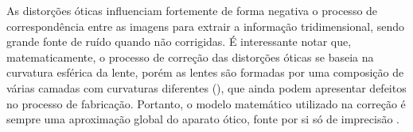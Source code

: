 As distorções óticas influenciam fortemente de forma negativa o processo de
correspondência entre as imagens para extrair a informação tridimensional, sendo
grande fonte de ruído quando não corrigidas. É interessante notar que,
matematicamente, o processo de correção das distorções óticas se baseia na
curvatura esférica da lente, porém as lentes são formadas por uma composição de
várias camadas com curvaturas diferentes (), que ainda podem
apresentar defeitos no processo de fabricação. Portanto, o modelo matemático
utilizado na correção é sempre uma aproximação global do aparato ótico, fonte
por si só de imprecisão \cite{WilsonShafer1994}.



